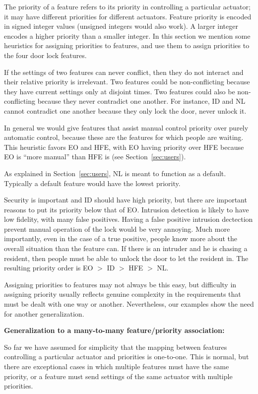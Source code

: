 \documentclass[conference]{IEEEtran}
\begin{document}
The priority of a feature refers to its priority in controlling a
particular actuator; it may have different priorities for different
actuators.
Feature priority is encoded in signed integer values (unsigned integers
would also work).
A larger integer encodes a higher priority than a smaller integer.
In this section we mention some heuristics for assigning priorities to
features, and use them to assign priorities to the four door lock
features.

If the settings of two features can never conflict, then they do not
interact and their relative priority is irrelevant.
Two features could be non-conflicting because they have current
settings only at disjoint times.
Two features could also be non-conflicting because they never contradict
one another.  
For instance, ID and NL cannot contradict one another because they
only lock the door, never unlock it.

In general we would give features that assist manual control priority
over purely automatic control, because these are
the features for which people are waiting.
This heuristic favors EO and HFE, with EO having priority over HFE because
EO is ``more manual'' than HFE is (see Section~\ref{sec:users}).

As explained in Section~\ref{sec:users}, NL is meant to function as a
default.
Typically a default feature would have the lowest priority.

Security is important and ID should have high priority, but there are
important reasons to put its priority below that of EO.
Intrusion detection is likely to have low fidelity,
with many false positives.
Having a false positive intrusion dectection
prevent manual operation of the lock
would be very annoying.
Much more importantly, even in the case of a true positive, people
know more about the overall situation than the feature can.
If there is an intruder and he 
is chasing a resident, then people must be able to unlock
the door to let the resident in.
The resulting priority order is EO $>$ ID $>$ HFE $>$ NL.

Assigning priorities to features may not always be this easy, but
difficulty in assigning priority usually
reflects genuine complexity in the
requirements that must be dealt with one way or another.
Nevertheless, our examples show the need for another generalization.

\vspace{2mm}
{\bf Generalization to a many-to-many feature/priority association:}

So far we have assumed for simplicity that the mapping between features
controlling a particular actuator and 
priorities is one-to-one.
This is normal, but there are exceptional cases in which multiple features
must have the same priority, or a feature must send settings of the
same actuator with multiple priorities.
\end{document}

